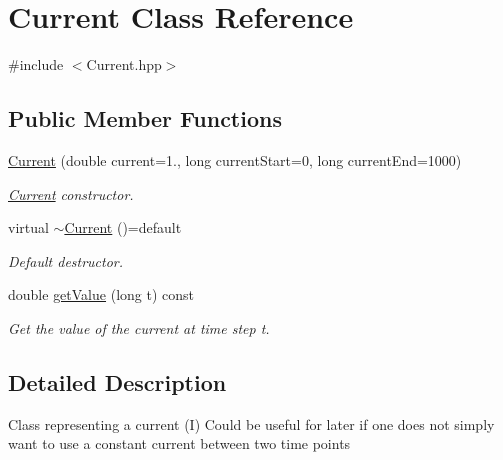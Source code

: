 \hypertarget{classCurrent}{\section{Current Class Reference}
\label{classCurrent}
}


{\ttfamily \#include $<$Current.\-hpp$>$}

\subsection*{Public Member Functions}
\begin{DoxyCompactItemize}
\item 
\hyperlink{classCurrent_a702cdf44b202e2474ffd245f03a27a7e}{Current} (double current=1., long current\-Start=0, long current\-End=1000)
\begin{DoxyCompactList}\small\item\em \hyperlink{classCurrent}{Current} constructor. \end{DoxyCompactList}\item 
\hypertarget{classCurrent_a91e25000b1c9e9399fd8af1076c5b81a}{virtual \hyperlink{classCurrent_a91e25000b1c9e9399fd8af1076c5b81a}{$\sim$\-Current} ()=default}\label{classCurrent_a91e25000b1c9e9399fd8af1076c5b81a}

\begin{DoxyCompactList}\small\item\em Default destructor. \end{DoxyCompactList}\item 
\hypertarget{classCurrent_a556f4c854dd7b34b8594672726f51968}{double \hyperlink{classCurrent_a556f4c854dd7b34b8594672726f51968}{get\-Value} (long t) const }\label{classCurrent_a556f4c854dd7b34b8594672726f51968}

\begin{DoxyCompactList}\small\item\em Get the value of the current at time step t. \end{DoxyCompactList}\end{DoxyCompactItemize}


\subsection{Detailed Description}
Class representing a current (I) Could be useful for later if one does not simply want to use a constant current between two time points 

